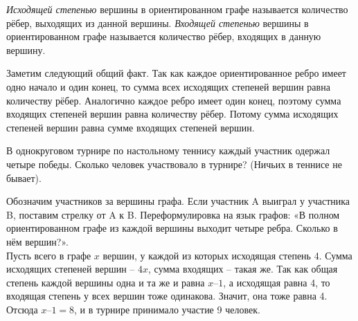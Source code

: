 \begin{dfn}
    \textit{Исходящей степенью} вершины в ориентированном графе называется количество рёбер, выходящих из данной вершины. \textit{Входящей степенью} вершины в ориентированном графе называется количество рёбер, входящих в данную вершину.
\end{dfn}
\hfill \break
Заметим следующий общий факт. Так как каждое ориентированное ребро имеет одно начало и один конец, то сумма всех исходящих степеней вершин равна количеству рёбер. Аналогично каждое ребро имеет один конец, поэтому сумма входящих степеней вершин равна количеству рёбер. Потому сумма исходящих степеней вершин равна сумме входящих степеней вершин.

\begin{thm}
    В однокруговом турнире по настольному теннису каждый участник одержал четыре победы. Сколько человек участвовало в турнире? (Ничьих в теннисе не бывает).
\end{thm}

\begin{prf}
    Обозначим участников за вершины графа. Если участник A выиграл у участника B, поставим стрелку от A к B. Переформулировка на язык графов: «В полном ориентированном графе из каждой вершины выходит четыре ребра. Сколько в нём вершин?».
    \\
    Пусть всего в графе $x$ вершин, у каждой из которых исходящая степень 4. Сумма исходящих степеней вершин -- $4x$, сумма входящих -- такая же. Так как общая степень каждой вершины одна и та же и равна $x – 1$, а исходящая равна 4, то входящая степень у всех вершин тоже одинакова. Значит, она тоже равна 4. Отсюда $x
    – 1 = 8$, и в турнире принимало участие 9 человек.
\end{prf}